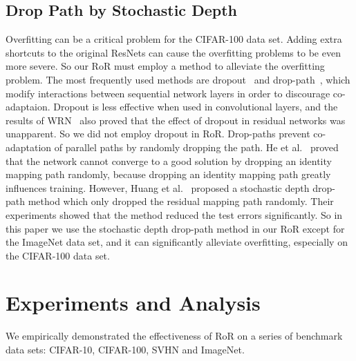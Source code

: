 \documentclass[journal]{IEEEtran}
\begin{document}
\subsection{Drop Path by Stochastic Depth}
Overfitting can be a critical problem for the CIFAR-100 data set. Adding extra shortcuts to the original ResNets can cause the overfitting problems to be even more severe. So our RoR must employ a method to alleviate the overfitting problem. The most frequently used methods are dropout~\cite{hinton2012dropout,sriva2014dropout} and drop-path~\cite{wan2013dropconnect}, which modify interactions between sequential network layers in order to discourage co-adaptaion. Dropout is less effective when used in convolutional layers, and the results of WRN~\cite{zagoruyko2016wrn} also proved that the effect of dropout in residual networks was unapparent. So we did not employ dropout in RoR. Drop-paths prevent co-adaptation of parallel paths by randomly dropping the path. He et al.~\cite{he2016preresnets} proved that the network cannot converge to a good solution by dropping an identity mapping path randomly, because dropping an identity mapping path greatly influences training. However, Huang et al.~\cite{huang2016SD} proposed a stochastic depth drop-path method which only dropped the residual mapping path randomly. Their experiments showed that the method reduced the test errors significantly. So in this paper we use the stochastic depth drop-path method in our RoR except for the ImageNet data set, and it can significantly alleviate overfitting, especially on the CIFAR-100 data set.

\section{Experiments and Analysis}
We empirically demonstrated the effectiveness of RoR on a series of benchmark data sets: CIFAR-10, CIFAR-100, SVHN and ImageNet.
\end{document}
